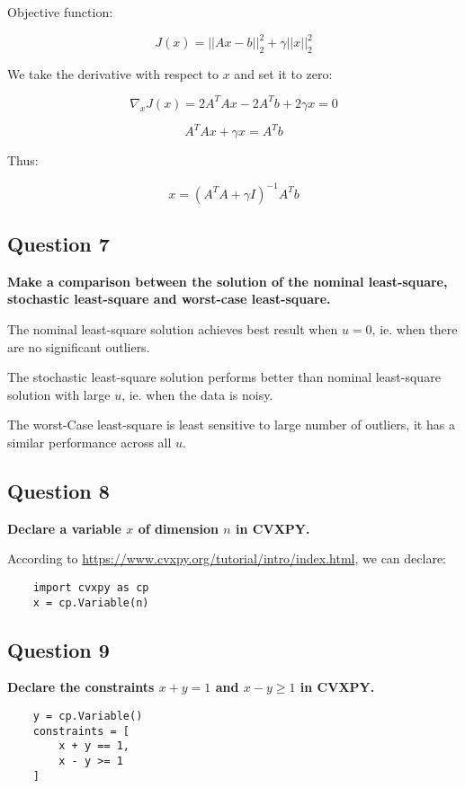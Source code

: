 Objective function: 

$$ J(x) = ||Ax - b||_2^2 + \gamma ||x||_2^2 $$

We take the derivative with respect to $x$ and set it to zero: 

$$ \nabla_x J(x) = 2 A^T A x - 2 A^T b + 2 \gamma x = 0 $$

$$ A^T A x + \gamma x = A^T b $$

Thus: 

$$ x = (A^T A + \gamma I)^{-1} A^T b $$


\subsection*{Question 7}
\textbf{Make a comparison between the solution of the nominal least-square, stochastic least-square and worst-case least-square.}

The nominal least-square solution achieves best result when $u=0$, ie. when there are no significant outliers.

The stochastic least-square solution performs better than nominal least-square solution with large $u$, ie. when the data is noisy.

The worst-Case least-square is least sensitive to large number of outliers, it has a similar performance across all $u$.

\subsection*{Question 8}
\textbf{Declare a variable $x$ of dimension $n$ in CVXPY.}

According to \href{https://www.cvxpy.org/tutorial/intro/index.html}{https://www.cvxpy.org/tutorial/intro/index.html}, we can declare: 

\begin{lstlisting}
    import cvxpy as cp
    x = cp.Variable(n)
\end{lstlisting}


\subsection*{Question 9}
\textbf{Declare the constraints \( x + y = 1 \) and \( x - y \geq 1 \) in CVXPY.}



\begin{lstlisting}
    y = cp.Variable()
    constraints = [
        x + y == 1,
        x - y >= 1
    ]
\end{lstlisting}


